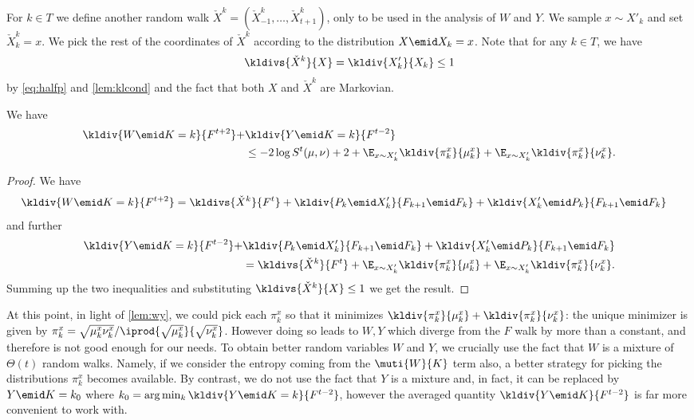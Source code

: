For $k\in T$ we define another random walk 
$\check{X}^k = 
(\check{X}^k_{-1},\ldots,\check{X}^k_{t+1})$, 
only to be used in the analysis of
$W$ and $Y$. We sample $x\sim X'_k$
and set $\check{X}^k_k = x$. We pick the rest of the coordinates of $\check{X}^k$ according to the distribution $X\emid X_k = x$. Note that for any $k\in T$, we have
\begin{align*}
\kldivs{\check{X}^k}{X} = \kldiv{X'_k}{X_k}\le 1
\end{align*} by \autoref{eq:halfp}
and \autoref{lem:klcond} and the fact that both $X$ and 
$\check{X}^k$ are Markovian.

\begin{lemma}
\label{lem:wy}
We have
\begin{align*}
\kldiv{W\emid K=k}{F^{t+2}} +& \kldiv{Y\emid K=k}{F^{t-2}}\\
&\le -2\log S^t(\mu,\nu) + 2 + \E_{x\sim X'_k}\kldiv{\pi_k^x}{\mu_k^x} + 
        \E_{x\sim X'_k}\kldiv{\pi_k^x}{\nu_k^x}.
\end{align*}
\end{lemma}
\begin{proof}
We have
\begin{align*}
\kldiv{W\emid K = k}{F^{t+2}} &= \kldivs{\check{X}^k}{F^t} + 
  \kldiv{P_k\emid X'_k}{F_{k+1}\emid F_{k}}
  +\kldiv{X'_k\emid P_k}{F_{k+1}\emid F_{k}}
\end{align*}
and further
\begin{align*}
\kldiv{Y\emid K = k}{F^{t-2}} +& 
  \kldiv{P_k\emid X'_k}{F_{k+1}\emid F_{k}}
  +\kldiv{X'_k\emid P_k}{F_{k+1}\emid F_{k}}
  \\&= \kldivs{\check{X}^k}{F^t}+\E_{x\sim X'_k}
      \kldiv{\pi_k^x}{\mu_k^x} + 
      \E_{x\sim X'_k}\kldiv{\pi_k^x}{\nu_k^x}.
\end{align*}
Summing up the two inequalities and substituting 
$\kldivs{\check{X}^k}{X}\le 1$ we get the result.
\end{proof}
At this point, in light of \autoref{lem:wy},
we could pick each $\pi_k^x$ so that it minimizes
$\kldiv{\pi_k^x}{\mu_k^x} + \kldiv{\pi_k^x}{\nu_k^x}$:
the unique minimizer is given by 
$\pi_k^x = \sqrt{\mu_k^x\nu_k^x} / 
\iprod{\sqrt{\mu_k^x}}{\sqrt{\nu_k^x}}$. 
However doing so leads to $W,Y$ which 
diverge from the $F$ walk by more than a constant,
and therefore is not good enough for our needs.
To obtain better random variables $W$ and $Y$, 
we crucially use the fact that 
$W$ is a mixture of $\Theta(t)$ random walks. Namely, if
we consider the entropy coming from the $\muti{W}{K}$ term
also, a better strategy for picking the distributions 
$\pi_k^x$ becomes available.
By contrast, we do not use the fact that $Y$ is a mixture
and, in fact, it can be replaced by $Y\emid K=k_0$ where
$k_0 = \arg\min_k\kldiv{Y\emid K = k}{F^{t-2}}$, however
the averaged quantity $\kldiv{Y\emid K}{F^{t-2}}$ is
far more convenient to work with.

